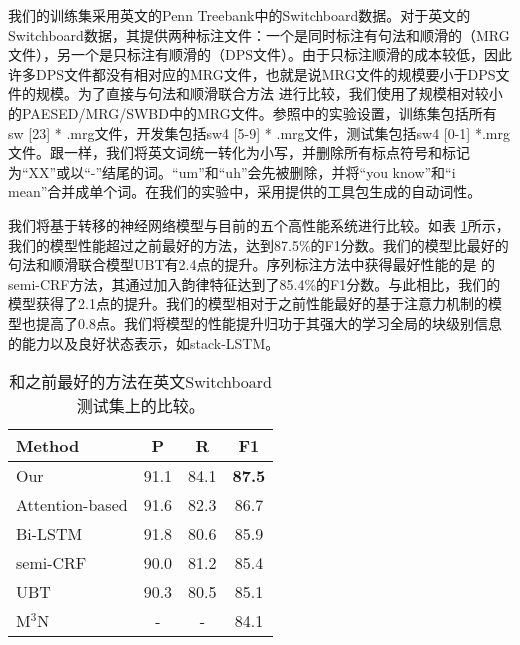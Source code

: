 我们的训练集采用英文的Penn Treebank中的Switchboard数据。对于英文的Switchboard数据，其提供两种标注文件：一个是同时标注有句法和顺滑的（MRG文件），另一个是只标注有顺滑的（DPS文件）。由于只标注顺滑的成本较低，因此许多DPS文件都没有相对应的MRG文件，也就是说MRG文件的规模要小于DPS文件的规模。为了直接与句法和顺滑联合方法 进行比较，我们使用了规模相对较小的PAESED/MRG/SWBD中的MRG文件。参照中的实验设置，训练集包括所有sw [23] * .mrg文件，开发集包括sw4 [5-9] * .mrg文件，测试集包括sw4 [0-1] *.mrg文件。跟一样，我们将英文词统一转化为小写，并删除所有标点符号和标记为“XX”或以“-”结尾的词。“um”和“uh”会先被删除，并将“you know”和“i mean”合并成单个词。在我们的实验中，采用提供的工具包生成的自动词性。

我们将基于转移的神经网络模型与目前的五个高性能系统进行比较。如表 \ref{compare-previous-work}所示，我们的模型性能超过之前最好的方法，达到87.5\%的F1分数。我们的模型比最好的句法和顺滑联合模型UBT有2.4点的提升。序列标注方法中获得最好性能的是 的semi-CRF方法，其通过加入韵律特征达到了85.4\%的F1分数。与此相比，我们的模型获得了2.1点的提升。我们的模型相对于之前性能最好的基于注意力机制的模型也提高了0.8点。我们将模型的性能提升归功于其强大的学习全局的块级别信息的能力以及良好状态表示，如stack-LSTM。


\begin{table}[htbp]
	\setlength{\tabcolsep}{15pt}
	
	\begin{center}
		\renewcommand{\arraystretch}{1.1}
		\begin{tabular}{l|ccc}
			\hline
			\bf    Method & \bf P & \bf R & \bf F1 \\
			\hline
			Our &  91.1 & 84.1 & \textbf{87.5}\\ 
			\hline
			Attention-based \citeyqy{wang-che-liu:2016:COLING} &  91.6 & 82.3 & 86.7\\ 
			Bi-LSTM \citeyqy{zayats2016disfluency} &  91.8 & 80.6 & 85.9\\ 
			semi-CRF \citeyqy{ferguson-durrett-klein:2015:NAACL-HLT} & 90.0 & 81.2 & 85.4\\
			UBT \citeyqy{wu-EtAl:2015:ACL-IJCNLP} &  90.3 & 80.5 & 85.1\\ 
			M$^3$N \citeyqy{qian2013disfluency} & - & - & 84.1\\           
			\hline
			
		\end{tabular}
	\end{center}
	\caption{\label{re_error}  和之前最好的方法在英文Switchboard测试集上的比较。 }
	\label{compare-previous-work}
\end{table}








